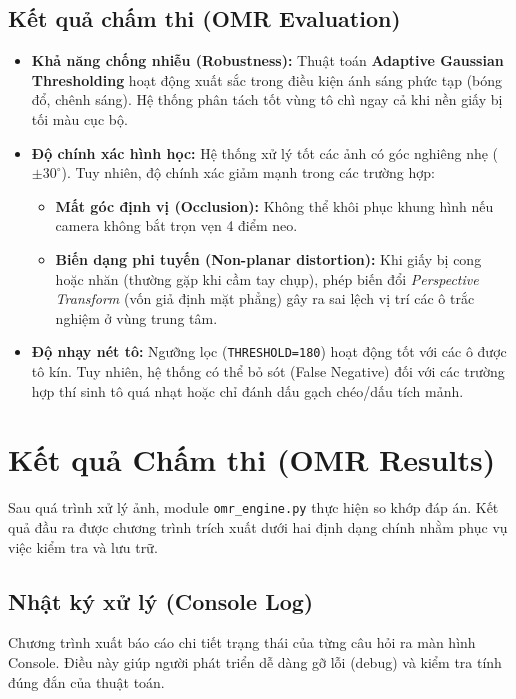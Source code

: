 \documentclass[6pt, a4paper]{report}
\begin{document}
	\subsection{Kết quả chấm thi (OMR Evaluation)}
	\begin{itemize}
		\item \textbf{Khả năng chống nhiễu (Robustness):} 
		Thuật toán \textbf{Adaptive Gaussian Thresholding} hoạt động xuất sắc trong điều kiện ánh sáng phức tạp (bóng đổ, chênh sáng). Hệ thống phân tách tốt vùng tô chì ngay cả khi nền giấy bị tối màu cục bộ.
		
		\item \textbf{Độ chính xác hình học:}
		Hệ thống xử lý tốt các ảnh có góc nghiêng nhẹ ($\pm 30^\circ$). Tuy nhiên, độ chính xác giảm mạnh trong các trường hợp:
		\begin{itemize}
			\item \textbf{Mất góc định vị (Occlusion):} Không thể khôi phục khung hình nếu camera không bắt trọn vẹn 4 điểm neo.
			\item \textbf{Biến dạng phi tuyến (Non-planar distortion):} Khi giấy bị cong hoặc nhăn (thường gặp khi cầm tay chụp), phép biến đổi \textit{Perspective Transform} (vốn giả định mặt phẳng) gây ra sai lệch vị trí các ô trắc nghiệm ở vùng trung tâm.
		\end{itemize}
		
		\item \textbf{Độ nhạy nét tô:}
		Ngưỡng lọc (\texttt{THRESHOLD=180}) hoạt động tốt với các ô được tô kín. Tuy nhiên, hệ thống có thể bỏ sót (False Negative) đối với các trường hợp thí sinh tô quá nhạt hoặc chỉ đánh dấu gạch chéo/dấu tích mảnh.
	\end{itemize}
	
	\section{Kết quả Chấm thi (OMR Results)}
	
	Sau quá trình xử lý ảnh, module \texttt{omr\_engine.py} thực hiện so khớp đáp án. Kết quả đầu ra được chương trình trích xuất dưới hai định dạng chính nhằm phục vụ việc kiểm tra và lưu trữ.
	
	\subsection{Nhật ký xử lý (Console Log)}
	Chương trình xuất báo cáo chi tiết trạng thái của từng câu hỏi ra màn hình Console. Điều này giúp người phát triển dễ dàng gỡ lỗi (debug) và kiểm tra tính đúng đắn của thuật toán.
	
\end{document}
